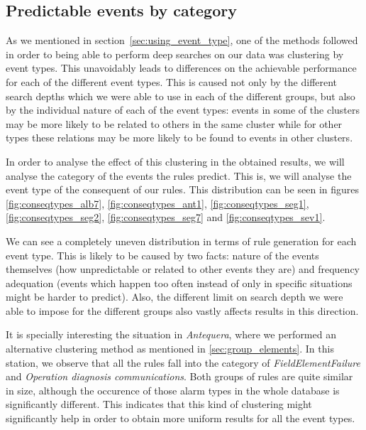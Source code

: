 \subsection{Predictable events by category}
As we mentioned in section~\ref{sec:using_event_type}, one of the methods followed in order to being able to perform deep searches on our data was clustering by event types. This unavoidably leads to differences on the achievable performance for each of the different event types. This is caused not only by the different search depths which we were able to use in each of the different groups, but also by the individual nature of each of the event types: events in some of the clusters may be more likely to be related to others in the same cluster while for other types these relations may be more likely to be found to events in other clusters. 

In order to analyse the effect of this clustering in the obtained results, we will analyse the category of the events the rules predict. This is, we will analyse the event type of the consequent of our rules. This distribution can be seen in figures \ref{fig:conseqtypes_alb7}, \ref{fig:conseqtypes_ant1}, \ref{fig:conseqtypes_seg1}, \ref{fig:conseqtypes_seg2}, \ref{fig:conseqtypes_seg7} and \ref{fig:conseqtypes_sev1}.

We can see a completely uneven distribution in terms of rule generation for each event type. This is likely to be caused by two facts: nature of the events themselves (how unpredictable or related to other events they are) and frequency adequation (events which happen too often instead of only in specific situations might be harder to predict). Also, the different limit on search depth we were able to impose for the different groups also vastly affects results in this direction.

It is specially interesting the situation in \emph{Antequera}, where we performed an alternative clustering method as mentioned in \ref{sec:group_elements}. In this station, we observe that all the rules fall into the category of \emph{FieldElementFailure} and \emph{Operation diagnosis communications}. Both groups of rules are quite similar in size, although the occurence of those alarm types in the whole database is significantly different. This indicates that this kind of clustering might significantly help in order to obtain more uniform results for all the event types.

